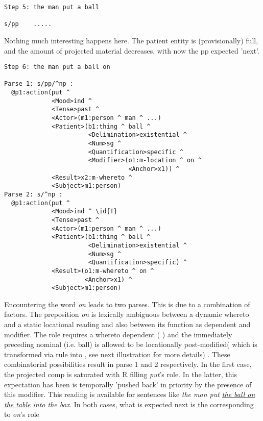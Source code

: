  \begin{verbatim}
Step 5: the man put a ball 

s/pp	.....
 \end{verbatim}
Nothing much interesting happens here. The patient entity is (provisionally) full, and the amount of projected material decreases, with now the pp expected 'next'.
\begin{verbatim}
Step 6: the man put a ball on

Parse 1: s/pp/^np : 
  @p1:action(put ^ 
             <Mood>ind ^ 
             <Tense>past ^ 
             <Actor>(m1:person ^ man ^ ...)
             <Patient>(b1:thing ^ ball ^ 
                       <Delimination>existential ^ 
                       <Num>sg ^ 
                       <Quantification>specific ^ 
                       <Modifier>(o1:m-location ^ on ^ 
                                  <Anchor>x1)) ^ 
             <Result>x2:m-whereto ^ 
             <Subject>m1:person)
Parse 2: s/^np : 
  @p1:action(put ^ 
             <Mood>ind ^ \id{T}
             <Tense>past ^ 
             <Actor>(m1:person ^ man ^ ...)
             <Patient>(b1:thing ^ ball ^ 
                       <Delimination>existential ^ 
                       <Num>sg ^ 
                       <Quantification>specific) ^ 
             <Result>(o1:m-whereto ^ on ^ 
                      <Anchor>x1) ^ 
             <Subject>m1:person)
 \end{verbatim}
Encountering the word \emph{on} leads to two parses. This is due to a combination of factors. The preposition \emph{on} is lexically ambiguous between a dynamic whereto and a static locational reading and also between its function as dependent and modifier. The  role requires a whereto dependent ( ) and the immediately preceding nominal (i.e. ball) is allowed to be locationally post-modified( which is transformed via rule into , see next illustration for more details) . These combinatorial possibilities result in parse 1 and 2 respectively. In the first case, the projected  comp is saturated with R filling \emph{put}'s  role. In the latter, this expectation has been is temporally 'pushed back' in priority by the presence of this modifier. This reading is available for sentences like \emph{the man put \underline{the ball on the table} into the box}. In both cases, what is expected next is the  corresponding to \emph{on}'s  role
